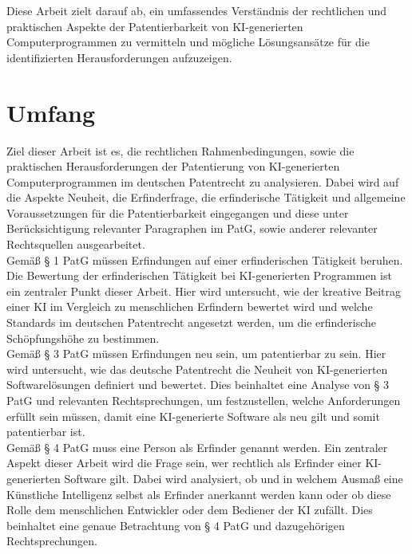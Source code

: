 Diese Arbeit zielt darauf ab, 
ein umfassendes Verständnis der rechtlichen 
und praktischen Aspekte der 
Patentierbarkeit von KI-generierten Computerprogrammen zu vermitteln 
und mögliche Lösungsansätze für die identifizierten Herausforderungen aufzuzeigen. 


\section{Umfang\label{sec:scope}}


Ziel dieser Arbeit ist es, 
die rechtlichen Rahmenbedingungen, 
sowie die praktischen Herausforderungen der Patentierung 
von KI-generierten Computerprogrammen im deutschen Patentrecht zu analysieren. 
Dabei wird auf die Aspekte Neuheit, die Erfinderfrage, 
die erfinderische Tätigkeit 
und allgemeine Voraussetzungen für die Patentierbarkeit eingegangen 
und diese unter Berücksichtigung relevanter Paragraphen im \gls{PatG}, 
sowie anderer relevanter Rechtsquellen ausgearbeitet. 
\\

Gemäß § 1 PatG müssen Erfindungen auf einer erfinderischen Tätigkeit beruhen. 
Die Bewertung der erfinderischen Tätigkeit 
bei KI-generierten Programmen ist ein
zentraler Punkt dieser Arbeit. Hier wird untersucht, 
wie der kreative Beitrag einer KI im Vergleich 
zu menschlichen Erfindern bewertet wird und 
welche Standards im deutschen Patentrecht angesetzt werden, 
um die erfinderische Schöpfungshöhe zu bestimmen.
\\

Gemäß § 3 PatG müssen Erfindungen neu sein, 
um patentierbar zu sein. 
Hier wird untersucht, 
wie das deutsche Patentrecht die 
Neuheit von KI-generierten Softwarelösungen definiert und bewertet. 
Dies beinhaltet eine Analyse von § 3 PatG und relevanten Rechtsprechungen, 
um festzustellen, 
welche Anforderungen erfüllt sein müssen, 
damit eine KI-generierte Software als neu gilt und somit patentierbar ist. 
\\

Gemäß § 4 PatG muss eine Person als Erfinder genannt werden. 
Ein zentraler Aspekt dieser Arbeit wird die Frage sein, 
wer rechtlich als Erfinder einer KI-generierten Software gilt. 
Dabei wird analysiert, 
ob und in welchem Ausmaß eine Künstliche Intelligenz 
selbst als Erfinder anerkannt werden kann
oder ob diese Rolle dem menschlichen Entwickler 
oder dem Bediener der KI zufällt. 
Dies beinhaltet eine genaue Betrachtung 
von § 4 PatG und dazugehörigen Rechtsprechungen.
\\

